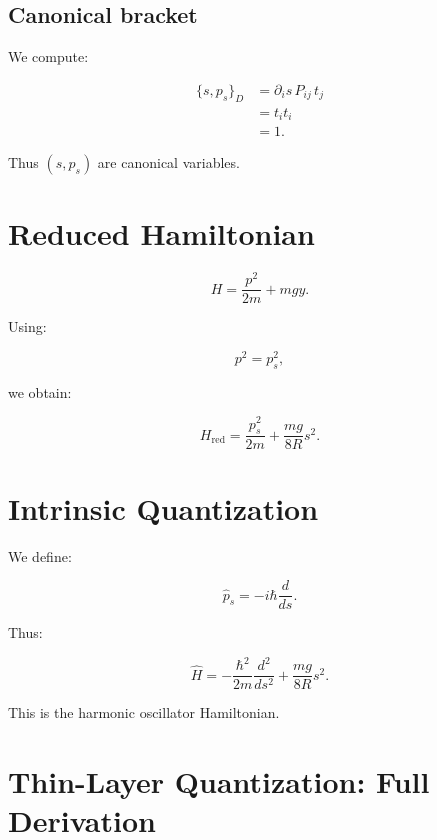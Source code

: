 \documentclass[11pt]{article}
\begin{document}
\subsection{Canonical bracket}

We compute:

\begin{align}
\{s, p_s\}_D
&= \partial_i s \, P_{ij} \, t_j \\
&= t_i t_i \\
&= 1.
\end{align}

Thus $(s,p_s)$ are canonical variables.

\section{Reduced Hamiltonian}

\begin{equation}
H = \frac{p^2}{2m} + mgy.
\end{equation}

Using:

\begin{equation}
p^2 = p_s^2,
\end{equation}

we obtain:

\begin{equation}
H_{\mathrm{red}} =
\frac{p_s^2}{2m} + \frac{mg}{8R}s^2.
\end{equation}

\section{Intrinsic Quantization}

We define:

\begin{equation}
\hat{p}_s = -i\hbar \frac{d}{ds}.
\end{equation}

Thus:

\begin{equation}
\hat{H} =
-\frac{\hbar^2}{2m}\frac{d^2}{ds^2}
+ \frac{mg}{8R}s^2.
\end{equation}

This is the harmonic oscillator Hamiltonian.


\section{Thin-Layer Quantization: Full Derivation}
\end{document}
